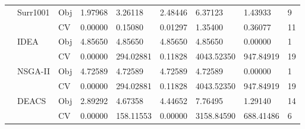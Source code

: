 \begin{table*}[!htb]
\begin{tabular}{lllllllll}
		& \multirow{2}{*}{Surr1001}          & Obj                                & 1.97968                            & 3.26118                            & 2.48446                              & 6.37123                             & 1.43933                           & 9                \\
		&                                    & CV                                 & 0.00000                            & 0.15080                            & 0.01297                              & 1.35400                             & 0.36077                           & 11               \\
		& \multirow{2}{*}{IDEA}              & Obj                                & 4.85650                            & 4.85650                            & 4.85650                              & 4.85650                             & 0.00000                           & 1                \\
		&                                    & CV                                 & 0.00000                            & 294.02881                          & 0.11828                              & 4043.52350                          & 947.84919                         & 19               \\
		& \multirow{2}{*}{NSGA-II}           & Obj                                & 4.72589                            & 4.72589                            & 4.72589                              & 4.72589                             & 0.00000                           & 1                \\
		&                                    & CV                                 & 0.00000                            & 294.02881                          & 0.11828                              & 4043.52350                          & 947.84919                         & 19               \\
		& \multirow{2}{*}{DEACS}             & Obj                                & 2.89292                            & 4.67358                            & 4.44652                              & 7.76495                             & 1.29140                           & 14               \\
		&                                    & CV                                 & 0.00000                            & 158.11553                          & 0.00000                              & 3158.84590                          & 688.41486                         & 6                \\

\end{tabular}
\end{table*}
